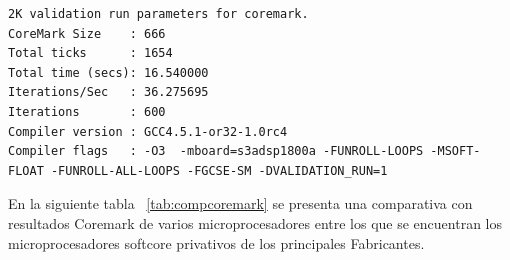 \begin{lstlisting}[frame=single,caption={Optimización nivel -O3 - Flags activos -FUNROLL-LOOPS -MSOFT-FLOAT
-FUNROLL-ALL-LOOPS -FGCSE-SM},label={lst:salidasO2},breaklines]
2K validation run parameters for coremark.
CoreMark Size    : 666
Total ticks      : 1654
Total time (secs): 16.540000
Iterations/Sec   : 36.275695
Iterations       : 600
Compiler version : GCC4.5.1-or32-1.0rc4
Compiler flags   : -O3  -mboard=s3adsp1800a -FUNROLL-LOOPS -MSOFT-FLOAT -FUNROLL-ALL-LOOPS -FGCSE-SM -DVALIDATION_RUN=1  
\end{lstlisting}

En la siguiente tabla ~\ref{tab:compcoremark} se presenta una comparativa con resultados Coremark de varios microprocesadores entre los que se
encuentran los microprocesadores softcore privativos de los principales Fabricantes.

